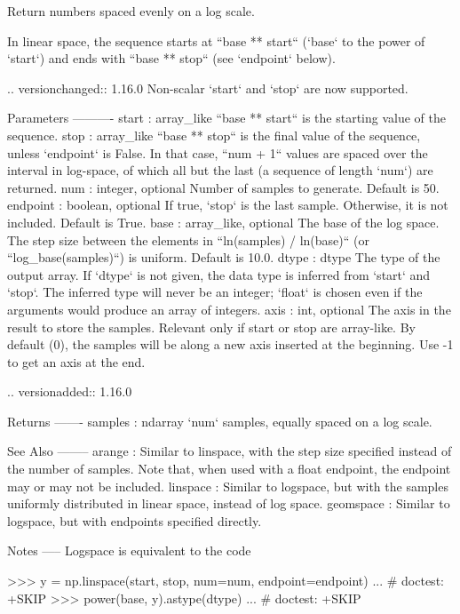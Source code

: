 \begin{DoxyVerb}Return numbers spaced evenly on a log scale.

In linear space, the sequence starts at ``base ** start``
(`base` to the power of `start`) and ends with ``base ** stop``
(see `endpoint` below).

.. versionchanged:: 1.16.0
    Non-scalar `start` and `stop` are now supported.

Parameters
----------
start : array_like
    ``base ** start`` is the starting value of the sequence.
stop : array_like
    ``base ** stop`` is the final value of the sequence, unless `endpoint`
    is False.  In that case, ``num + 1`` values are spaced over the
    interval in log-space, of which all but the last (a sequence of
    length `num`) are returned.
num : integer, optional
    Number of samples to generate.  Default is 50.
endpoint : boolean, optional
    If true, `stop` is the last sample. Otherwise, it is not included.
    Default is True.
base : array_like, optional
    The base of the log space. The step size between the elements in
    ``ln(samples) / ln(base)`` (or ``log_base(samples)``) is uniform.
    Default is 10.0.
dtype : dtype
    The type of the output array.  If `dtype` is not given, the data type
    is inferred from `start` and `stop`. The inferred type will never be
    an integer; `float` is chosen even if the arguments would produce an
    array of integers.
axis : int, optional
    The axis in the result to store the samples.  Relevant only if start
    or stop are array-like.  By default (0), the samples will be along a
    new axis inserted at the beginning. Use -1 to get an axis at the end.

    .. versionadded:: 1.16.0


Returns
-------
samples : ndarray
    `num` samples, equally spaced on a log scale.

See Also
--------
arange : Similar to linspace, with the step size specified instead of the
         number of samples. Note that, when used with a float endpoint, the
         endpoint may or may not be included.
linspace : Similar to logspace, but with the samples uniformly distributed
           in linear space, instead of log space.
geomspace : Similar to logspace, but with endpoints specified directly.

Notes
-----
Logspace is equivalent to the code

>>> y = np.linspace(start, stop, num=num, endpoint=endpoint)
... # doctest: +SKIP
>>> power(base, y).astype(dtype)
... # doctest: +SKIP


\end{DoxyVerb}
